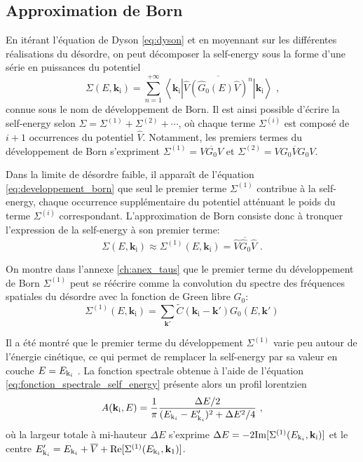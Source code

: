 \subsection{Approximation de Born}
En itérant l'équation de Dyson \ref{eq:dyson} et en moyennant sur les différentes réalisations du désordre, on peut décomposer la self-energy sous la forme d'une série en puissances du potentiel
\begin{equation}
\Sigma(E,\mathbf{k}_{\mathrm{i}}) = \sum_{n=1}^{+\infty}{\overline{\left\langle \mathbf{k}_{\mathrm{i}}\left| \hat{V} \left(\hat{G}_0(E) \hat{V}\right)^n \right|\mathbf{k}_{\mathrm{i}}\right\rangle}} \text{ ,}
\label{eq:developpement_born}
\end{equation}
connue sous le nom de développement de Born. Il est ainsi possible d'écrire la self-energy selon $\Sigma=\Sigma^{(1)}+\Sigma^{(2)} + \cdots$, où chaque terme $\Sigma^{(i)}$ est composé de $i+1$ occurrences du potentiel $\hat{V}$. Notamment, les premiers termes du développement de Born s'expriment $\Sigma^{(1)}=\overline{V G_0 V}$ et $\Sigma^{(2)}=\overline{V G_0 V G_0 V}$.

Dans la limite de désordre faible, il apparaît de l'équation \ref{eq:developpement_born} que seul le premier terme $\Sigma^{(1)}$ contribue à la self-energy, chaque occurrence supplémentaire du potentiel atténuant le poids du terme $\Sigma^{(i)}$ correspondant. L'approximation de Born consiste donc à tronquer l'expression de la self-energy à son premier terme:
\begin{equation}
\Sigma(E,\mathbf{k}_{\mathrm{i}})\approx \Sigma^{(1)}(E,\mathbf{k}_{\mathrm{i}})=\overline{\hat{V}\hat{G}_0 \hat{V}} \text{ .}
\end{equation}

On montre dans l'annexe \ref{ch:anex_taus} que le premier terme du développement de Born $\Sigma^{(1)}$  peut se réécrire comme la convolution du spectre des fréquences spatiales du désordre avec la fonction de Green libre $G_0$:
\begin{equation}
\Sigma^{(1)}(E,\mathbf{k}_{\mathrm{i}})=\sum_{\mathbf{k}'}{\widetilde{C}(\mathbf{k}_{\mathrm{i}}-\mathbf{k}') G_0(E,\mathbf{k}')}
\end{equation}



Il a été montré que le premier terme du développement $\Sigma^{(1)}$ varie peu autour de l'énergie cinétique, ce qui permet de remplacer la self-energy  par sa valeur en couche $E=E_{\mathrm{k}_i}$ \citep{kuhn2007coherent}. La fonction spectrale obtenue à l'aide de l'équation \ref{eq:fonction_spectrale_self_energy} présente alors un profil lorentzien
\begin{equation}
A(\mathbf{k}_{\mathrm{i}},E)= \frac{1}{\pi} \frac{\Delta E/2}{(E_{\mathrm{k}_i} - E_{\mathrm{k}_i}')^2+\Delta E^2/4} \text{ ,}
\end{equation}
où la largeur totale à mi-hauteur $\Delta E$ s'exprime $\Delta E=-2 \mathrm{Im}[\Sigma^{(1)}(E_{\mathrm{k}_i},\mathbf{k}_{\mathrm{i}})]$ et le centre $E_{\mathrm{k}_i}'=E_{\mathrm{k}_i}+\overline{V}+\mathrm{Re}[\Sigma^{(1)}(E_{\mathrm{k}_i},\mathbf{k}_{\mathrm{1}})]$.

